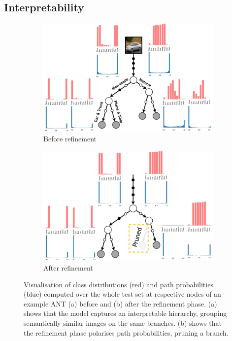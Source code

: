 \subsection{Interpretability}
\begin{figure}[t!]
	\center
	\begin{subfigure}[t]{0.9\linewidth}
		\includegraphics[width=\linewidth]{chapter_7/figures/fig_7_9.png}
		\vspace{-6mm}
		\caption{Before refinement}
	\end{subfigure}
	\hspace{4.66mm}
	\begin{subfigure}[t]{0.9\linewidth}
		\includegraphics[width=\linewidth]{chapter_7/figures/fig_7_10.png}
		\vspace{-6mm}
		\caption{After refinement}
	\end{subfigure}
	\caption{\small Visualisation of class distributions (red) and path probabilities (blue) computed over the whole test set at respective nodes of an example ANT (a) before and (b) after the refinement phase. (a) shows that the model captures an interpretable hierarchy, grouping semantically similar images on the same branches. (b) shows that the refinement phase polarises path probabilities, pruning a branch.}
	\label{fig:learnedmodel}
\end{figure}


